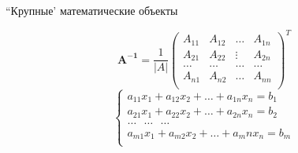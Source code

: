\documentclass{beamer}[aspectratio=169]
\begin{document}

\begin{frame}{``Крупные' математические объекты}
\transwipe


\begin{displaymath}
\mathbf{A^{-1}}=\dfrac{1}{|A|}
\left( \begin{array}{cccc}
A_{11} & A_{12} & \ldots & A_{1n} \\
A_{21} & A_{22} & \vdots & A_{2n} \\
\ldots & \ldots & \ldots & \ldots \\
A_{n1} & A_{n2} & \ldots & A_{nn} \\
\end{array} \right)^T
\end{displaymath}
\vspace{1cm}
\begin{displaymath}
\left\{ \begin{array}{l}
 a_{11}x_1 + a_{12}x_2 + \ldots + a_{1n}x_n = b_1 \\
 a_{21}x_1 + a_{22}x_2 + \ldots + a_{2n}x_n = b_2 \\
 \ldots \ \ \ \ldots \ \ \  \ldots \\
 a_{m1}x_1 + a_{m2}x_2 + \ldots + a_mn x_n = b_m \\                    
  \end{array} \right.
\end{displaymath}

\end{frame}
\end{document}
